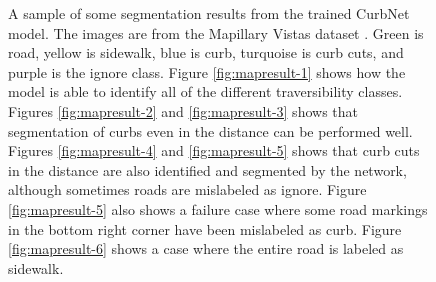 \begin{figure}
	\caption[Mapillary Vistas Segmentation Results]{A sample of some segmentation results from the trained CurbNet model. The images are from the Mapillary Vistas dataset \cite{mapillary}. Green is road, yellow is sidewalk, blue is curb, turquoise is curb cuts, and purple is the ignore class. Figure \ref{fig:mapresult-1} shows how the model is able to identify all of the different traversibility classes. Figures \ref{fig:mapresult-2} and \ref{fig:mapresult-3} shows that segmentation of curbs even in the distance can be performed well. Figures \ref{fig:mapresult-4} and \ref{fig:mapresult-5} shows that curb cuts in the distance are also identified and segmented by the network, although sometimes roads are mislabeled as ignore. Figure \ref{fig:mapresult-5} also shows a failure case where some road markings in the bottom right corner have been mislabeled as curb. Figure \ref{fig:mapresult-6} shows a case where the entire road is labeled as sidewalk.}
	\label{fig:experiments-resultsmapillary}
\end{figure}